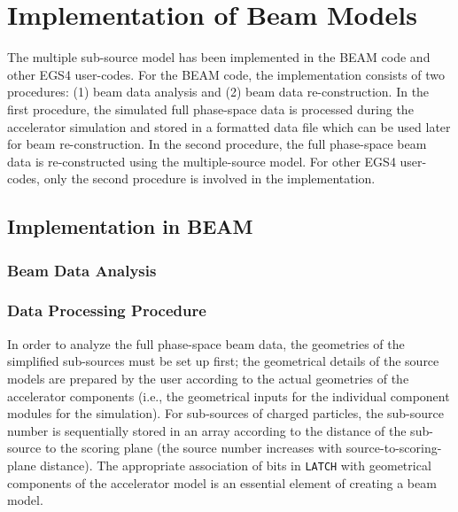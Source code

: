 \documentclass[12pt,twoside]{article}
\begin{document}
\section{Implementation of Beam Models}

The multiple sub-source model has been implemented in the BEAM code and other EGS4 user-codes. For the BEAM code, the implementation consists of two procedures: (1) beam data analysis and (2) beam data re-construction. In the first procedure, the simulated full phase-space data is processed during the accelerator simulation and stored in a formatted data file which can be used later for beam re-construction. In the second procedure, the full phase-space beam data is re-constructed using the multiple-source model. For other EGS4 user-codes, only the second procedure is involved in the implementation.

\subsection{Implementation in BEAM}
\subsubsection{Beam Data Analysis}

\subsubsection{Data Processing Procedure}
In order to analyze the full phase-space beam data, the geometries of the
simplified sub-sources must be set up first; the geometrical details of
the source models are prepared by the user according to the actual
geometries of the accelerator components (i.e., the geometrical inputs for
the individual component modules for the simulation). For sub-sources of
charged particles, the sub-source number is sequentially stored in an
array according to the distance of the sub-source to the scoring plane
(the source number increases with source-to-scoring-plane distance).
The appropriate association of bits in {\tt LATCH} with geometrical
components of the accelerator model is an essential element of creating
a beam model.
\end{document}
